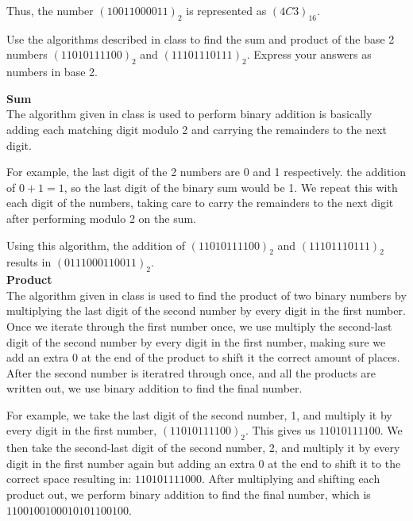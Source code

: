 \documentclass[12pt]{article}
\newenvironment{exercise}[2][Exercise]{\begin{trivlist}
\item[\hskip \labelsep {\bfseries #1}\hskip \labelsep {\bfseries #2.}]}{\end{trivlist}}
\begin{document}
Thus, the number $(100 1100 0011)_2$ is represented as $(4C3)_{16}$.

\pagebreak

\begin{exercise}{3b}
Use the algorithms described in class to find the sum and product of the
base 2 numbers $(110 1011 1100)_2$ and $(111 0111 0111)_2$. Express your answers as numbers in base 2.
\end{exercise}

\textbf{Sum\\}
The algorithm given in class is used to perform binary addition is basically adding each matching digit modulo 2 and carrying the remainders to the next digit.

For example, the last digit of the 2 numbers are 0 and 1 respectively. the addition of $0 + 1 = 1$, so the last digit of the binary sum would be 1. We repeat this with each digit of the numbers, taking care to carry the remainders to the next digit after performing modulo 2 on the sum.  

Using this algorithm, the addition of $(110 1011 1100)_2$ and $(111 0111 0111)_2$ results in $(0111000110011)_2$. \\

\textbf{Product\\}
The algorithm given in class is used to find the product of two binary numbers by multiplying the last digit of the second number by every digit in the first number. Once we iterate through the first number once, we use multiply the second-last digit of the second number by every digit in the first number, making sure we add an extra 0 at the end of the product to shift it the correct amount of places. After the second number is iteratred through once, and all the products are written out, we use binary addition to find the final number.

For example, we take the last digit of the second number, 1, and multiply it by every digit in the first number, $(110 1011 1100)_2$. This gives us $11010111100$. We then take the second-last digit of the second number, 2, and multiply it by every digit in the first number again but adding an extra 0 at the end to shift it to the correct space resulting in: $110101111000$. After multiplying and shifting each product out, we perform binary addition to find the final number, which is $11 0010 0100 0101 0110 0100$.

\pagebreak

\end{document}
